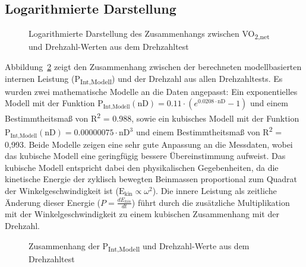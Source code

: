 \documentclass[
  letterpaper,
  DIV=11]{scrartcl}
\begin{document}
\subsection{Logarithmierte Darstellung}

\begin{figure}


\caption{\label{fig-DT_VO2_nD_log}Logarithmierte Darstellung des
Zusammenhangs zwischen VO\textsubscript{2,net} und Drehzahl-Werten aus
dem Drehzahltest}

\end{figure}%

Abbildung~\ref{fig-DT_PInt_nD_all} zeigt den Zusammenhang zwischen der
berechneten modellbasierten internen Leistung
(P\textsubscript{Int,Modell}) und der Drehzahl aus allen Drehzahltests.
Es wurden zwei mathematische Modelle an die Daten angepasst: Ein
exponentielles Modell mit der Funktion
\(\text{P}_\text{Int,Modell}(\text{nD}) = 0.11 \cdot (e^{0.0208 \cdot \text{nD}} - 1)\)
und einem Bestimmtheitsmaß von R\textsuperscript{2} = 0.988, sowie ein
kubisches Modell mit der Funktion
\(\text{P}_\text{Int,Modell}(\text{nD}) = 0.00000075 \cdot \text{nD}^3\)
und einem Bestimmtheitsmaß von R\textsuperscript{2} = 0,993. Beide
Modelle zeigen eine sehr gute Anpassung an die Messdaten, wobei das
kubische Modell eine geringfügig bessere Übereinstimmung aufweist. Das
kubische Modell entspricht dabei den physikalischen Gegebenheiten, da
die kinetische Energie der zyklisch bewegten Beinmassen proportional zum
Quadrat der Winkelgeschwindigkeit ist
(\(\text{E}_{\text{kin}} \propto \omega^2\)). Die innere Leistung als
zeitliche Änderung dieser Energie (\(P = \frac{dE_{kin}}{dt}\)) führt
durch die zusätzliche Multiplikation mit der Winkelgeschwindigkeit zu
einem kubischen Zusammenhang mit der Drehzahl.

\begin{figure}


\caption{\label{fig-DT_PInt_nD_all}Zusammenhang der
P\textsubscript{Int,Modell} und Drehzahl-Werte aus dem Drehzahltest}

\end{figure}%
\end{document}
